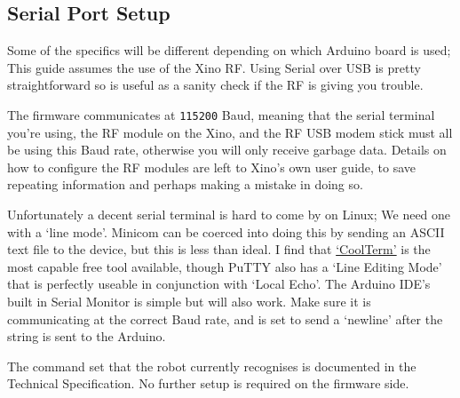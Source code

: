 \subsection{Serial Port Setup}

Some of the specifics will be different depending on which Arduino board is used; This guide assumes the use of the Xino RF. Using Serial over USB is pretty straightforward so is useful as a sanity check if the RF is giving you trouble.

The firmware communicates at \texttt{115200} Baud, meaning that the serial terminal you're using, the RF module on the Xino, and the RF USB modem stick must all be using this Baud rate, otherwise you will only receive garbage data. Details on how to configure the RF modules are left to Xino's own user guide, to save repeating information and perhaps making a mistake in doing so.

Unfortunately a decent serial terminal is hard to come by on Linux; We need one with a `line mode'. Minicom can be coerced into doing this by sending an ASCII text file to the device, but this is less than ideal. I find that \href{http://freeware.the-meiers.org/}{`CoolTerm'} is the most capable free tool available, though PuTTY also has a `Line Editing Mode' that is perfectly useable in conjunction with `Local Echo'. The Arduino IDE's built in Serial Monitor is simple but will also work. Make sure it is communicating at the correct Baud rate, and is set to send a `newline' after the string is sent to the Arduino.

The command set that the robot currently recognises is documented in the Technical Specification. No further setup is required on the firmware side.

